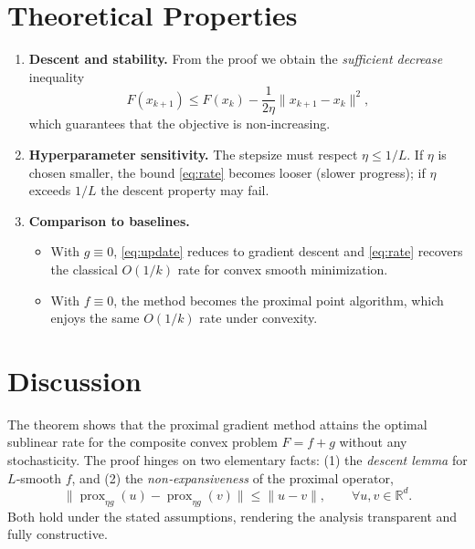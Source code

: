\documentclass{article}
\newcommand{\prox}{\operatorname{prox}}
\newcommand{\R}{\mathbb{R}}
\begin{document}
\section*{Theoretical Properties}
\begin{enumerate}[nosep]
\item \textbf{Descent and stability.}
From the proof we obtain the \emph{sufficient decrease} inequality
\[
F(x_{k+1})\le F(x_{k})-\frac{1}{2\eta}\|x_{k+1}-x_{k}\|^{2},
\]
which guarantees that the objective is non‑increasing.

\item \textbf{Hyperparameter sensitivity.}
The stepsize must respect $\eta\le 1/L$. If $\eta$ is chosen smaller,
the bound \eqref{eq:rate} becomes looser (slower progress); if $\eta$ exceeds $1/L$ the descent property may fail.

\item \textbf{Comparison to baselines.}
\begin{itemize}[nosep]
\item With $g\equiv0$, \eqref{eq:update} reduces to gradient descent and \eqref{eq:rate} recovers the classical $O(1/k)$ rate for convex smooth minimization.
\item With $f\equiv0$, the method becomes the proximal point algorithm, which enjoys the same $O(1/k)$ rate under convexity.
\end{itemize}
\end{enumerate}

\section*{Discussion}
The theorem shows that the proximal gradient method attains the optimal
sublinear rate for the composite convex problem $F=f+g$ without any
stochasticity. The proof hinges on two elementary facts:
(1) the \emph{descent lemma} for $L$‑smooth $f$, and (2) the
\emph{non‑expansiveness} of the proximal operator,
\[
\|\prox_{\eta g}(u)-\prox_{\eta g}(v)\|\le\|u-v\|,\qquad\forall u,v\in\R^{d}.
\]
Both hold under the stated assumptions, rendering the analysis
transparent and fully constructive.
\end{document}
